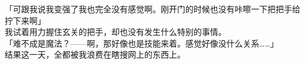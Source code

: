 「可跟我说我变强了我也完全没有感觉啊。刚开门的时候也没有咔嚓一下把把手给拧下来啊」\\

我试着用力握住玄关的把手，却也没有发生什么特别的事情。\\

「难不成是魔法？——啊，那好像也是技能来着。感觉好像没什么关系……」\\

结果这一天，全都被我浪费在瞎搜网上的东西上。\\
